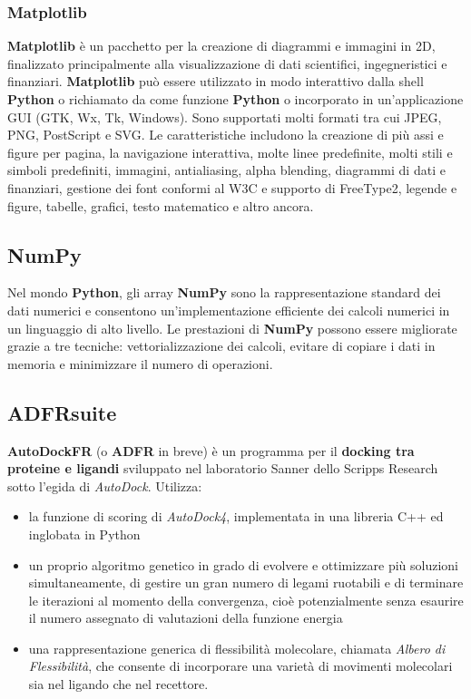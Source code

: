 \subsubsection{Matplotlib}
\textbf{Matplotlib} è un pacchetto per la creazione di diagrammi e immagini in 2D, finalizzato principalmente alla visualizzazione di dati scientifici, ingegneristici e finanziari. \textbf{Matplotlib} può essere utilizzato in modo interattivo dalla shell \textbf{Python} o richiamato da come funzione \textbf{Python} o incorporato in un'applicazione GUI (GTK, Wx, Tk, Windows). Sono supportati molti formati tra cui JPEG, PNG, PostScript e SVG. Le caratteristiche includono la creazione di più assi e figure per pagina, la navigazione interattiva, molte linee predefinite, molti stili e simboli predefiniti, immagini, antialiasing, alpha blending, diagrammi di dati e finanziari, gestione dei font conformi al W3C e supporto di FreeType2, legende e figure, tabelle, grafici, testo matematico e altro ancora\cite{barrett2005matplotlib}.

\subsection{NumPy}
Nel mondo \textbf{Python}, gli array \textbf{NumPy} sono la rappresentazione standard dei dati numerici e consentono un'implementazione efficiente dei calcoli numerici in un linguaggio di alto livello. Le prestazioni di \textbf{NumPy} possono essere migliorate grazie a tre tecniche: vettorializzazione dei calcoli, evitare di copiare i dati in memoria e minimizzare il numero di operazioni\cite{van2011numpy}.

\subsection{ADFRsuite}
\textbf{AutoDockFR} (o \textbf{ADFR} in breve) è un programma per il \textbf{docking tra proteine e ligandi} sviluppato nel laboratorio Sanner dello Scripps Research sotto l'egida di \textit{AutoDock}.\newline
Utilizza:

\begin{itemize}
    \item la funzione di scoring di \textit{AutoDock4}, implementata in una libreria C++ ed inglobata in Python
    \item un proprio algoritmo genetico in grado di evolvere e ottimizzare più soluzioni simultaneamente, di gestire un gran numero di legami ruotabili e di terminare le iterazioni al momento della convergenza, cioè potenzialmente senza esaurire il numero assegnato di valutazioni della funzione energia
    \item una rappresentazione generica di flessibilità molecolare, chiamata \textit{Albero di Flessibilità}, che consente di incorporare una varietà di movimenti molecolari sia nel ligando che nel recettore.
\end{itemize}

